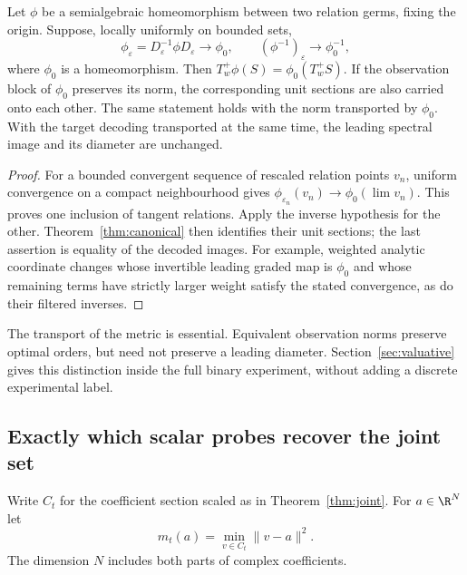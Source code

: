 \begin{theorem}\label{thm:filtered-naturality}
Let $\phi$ be a semialgebraic homeomorphism between two relation germs,
fixing the origin. Suppose, locally uniformly on bounded sets,
\[
 \phi_\varepsilon=D_\varepsilon^{-1}\phi D_\varepsilon
       \longrightarrow\phi_0,\qquad
 (\phi^{-1})_\varepsilon\longrightarrow\phi_0^{-1},
\]
where $\phi_0$ is a homeomorphism. Then
$T_w^+\phi(S)=\phi_0(T_w^+S)$. If the observation block of $\phi_0$
preserves its norm, the corresponding unit sections are also carried
onto each other. The same statement holds with the norm transported by
$\phi_0$. With the target decoding transported at the same time, the
leading spectral image and its diameter are unchanged.
\end{theorem}
\begin{proof}
For a bounded convergent sequence of rescaled relation points $v_n$,
uniform convergence on a compact neighbourhood gives
$\phi_{\varepsilon_n}(v_n)\to\phi_0(\lim v_n)$. This proves one
inclusion of tangent relations. Apply the inverse hypothesis for the
other. Theorem~\ref{thm:canonical} then identifies their unit sections;
the last assertion is equality of the decoded images. For example,
weighted analytic coordinate changes whose invertible leading graded
map is $\phi_0$ and whose remaining terms have strictly larger weight
satisfy the stated convergence, as do their filtered inverses.
\end{proof}

The transport of the metric is essential. Equivalent observation norms
preserve optimal orders, but need not preserve a leading diameter.
Section~\ref{sec:valuative} gives this distinction inside the full binary
experiment, without adding a discrete experimental label.

\subsection{Exactly which scalar probes recover the joint set}
Write $C_t$ for the coefficient section scaled as in
Theorem~\ref{thm:joint}. For $a\in\R^N$ let
\begin{equation}\label{eq:quadratic-probe}
 m_t(a)=\min_{v\in C_t}\|v-a\|^2.
\end{equation}
The dimension $N$ includes both parts of complex coefficients.


